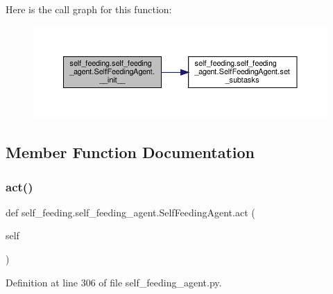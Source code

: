 Here is the call graph for this function\+:
\nopagebreak
\begin{figure}[H]
\begin{center}
\leavevmode
\includegraphics[width=350pt]{classself__feeding_1_1self__feeding__agent_1_1SelfFeedingAgent_ac76dc7e656c40b4209513286a5b1b2d9_cgraph}
\end{center}
\end{figure}


\subsection{Member Function Documentation}
\mbox{\label{classself__feeding_1_1self__feeding__agent_1_1SelfFeedingAgent_a7306b2ce2dbf45f5ac67bd374e66718a}} 
\subsubsection{\texorpdfstring{act()}{act()}}
{\footnotesize\ttfamily def self\+\_\+feeding.\+self\+\_\+feeding\+\_\+agent.\+Self\+Feeding\+Agent.\+act (\begin{DoxyParamCaption}\item[{}]{self }\end{DoxyParamCaption})}



Definition at line 306 of file self\+\_\+feeding\+\_\+agent.\+py.



